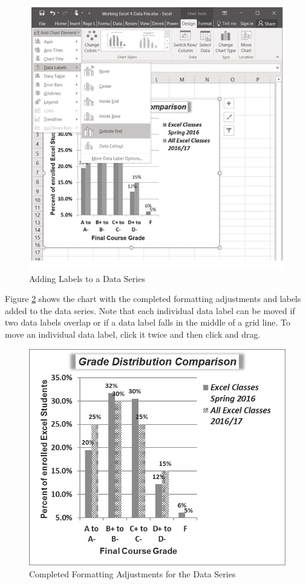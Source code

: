 \begin{figure}[H]
	\centering
	\includegraphics[width=\maxwidth{.95\linewidth}]{gfx/ch04_fig37}
	\caption{Adding Labels to a Data Series}
	\label{04:fig37}
\end{figure}

Figure \ref{04:fig38} shows the  chart with the completed formatting adjustments and labels added to the data series. Note that each individual data label can be moved if two data labels overlap or if a data label falls in the middle of a grid line. To move an individual data label, click it twice and then click and drag.

\begin{figure}[H]
	\centering
	\includegraphics[width=\maxwidth{.95\linewidth}]{gfx/ch04_fig38}
	\caption{Completed Formatting Adjustments for the Data Series}
	\label{04:fig38}
\end{figure}

